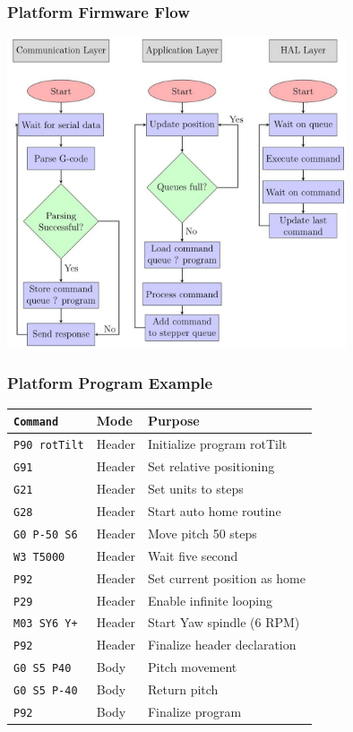 \documentclass[aspectratio=43]{beamer}
\begin{document}
\begin{frame}[fragile]
  \frametitle{Platform Firmware Flow}

  \centering
  \includegraphics[width=0.75\textwidth]{../img/platform_flow.jpg}

\end{frame}

\begin{frame}[fragile]
	\frametitle{Platform Program Example}
\begin{tabular}{lll}
  \hline
  \texttt{Command}     & Mode   & Purpose                      \\
  \hline
  \texttt{P90 rotTilt} & Header & Initialize program rotTilt   \\
  \texttt{G91}         & Header & Set relative positioning     \\
  \texttt{G21}         & Header & Set units to steps           \\
  \texttt{G28}         & Header & Start auto home routine      \\
  \texttt{G0 P-50 S6}  & Header & Move pitch 50 steps           \\
  \texttt{W3 T5000}    & Header & Wait five second             \\
  \texttt{P92}         & Header & Set current position as home \\
  \texttt{P29}         & Header & Enable infinite looping      \\
  \texttt{M03 SY6 Y+}  & Header & Start Yaw spindle (6 RPM)    \\
  \texttt{P92}         & Header & Finalize header declaration  \\
  \texttt{G0 S5 P40}   & Body   & Pitch movement               \\
  \texttt{G0 S5 P-40}  & Body   & Return pitch                 \\
  \texttt{P92}         & Body   & Finalize program             \\
  \hline
\end{tabular}
\end{frame}
\end{document}
